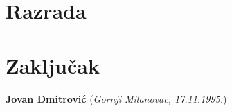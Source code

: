 \documentclass[12pt,oneside]{memoir}
\begin{document}
\chapter{Razrada}
\label{chp:razrada}

\chapter{Zaključak}

\literatura

\backmatter

\begin{biografija}
  \textbf{Jovan Dmitrović} (\emph{Gornji Milanovac, 17.11.1995.})
\end{biografija}
\end{document}
